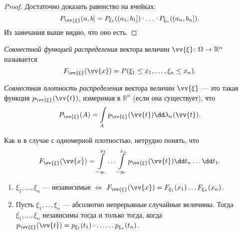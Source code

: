  \begin{proof}
     Достаточно доказать равенство на ячейках:
     $$P_{\vv{\xi}}(a, b] = P_{\xi_1}((a_1, b_1])\cdot\ldots\cdot P_{\xi_n}((a_n, b_n]).$$
     Из замечания выше видно, что оно есть.
 \end{proof}

 \begin{definition} \textit{Совместной функцией распределения} вектора величин $\vv{\xi} \colon \Omega \rightarrow \mathbb{R}^n$ называется
     $$F_{\vv{\xi}}(\vv{x}) = P(\xi_1 \le x_1, \ldots, \xi_n \le x_n).$$
 \end{definition}

 \begin{definition}\textit{Совместная плотность распределения} вектора величин $\vv{\xi}$ --- это такая функция $p_{\vv{\xi}}(\vv{t})$, измеримая в $\mathbb{R}^n$ (если она существует), что
     $$P_{\vv{\xi}}(A) =\int\limits_A p_{\vv{\xi}}(\vv{t})\dd\lambda_n(\vv{t}).$$
 \end{definition}

 Как и в случае с одномерной плотностью, нетрудно понять, что
     $$F_{\vv{\xi}}(\vv{x}) =
         \int\limits_{-\infty}^{x_1}\ldots\int\limits_{-\infty}^{x_n}p_{\vv{\xi}}(\vv{t})\dd t_n\ldots \dd t_1.$$

 \begin{corollary}
     \begin{enumerate}
         \item $\xi_1, \ldots, \xi_n$ --- независимые $\iff$ $F_{\vv{\xi}}(\vv{x}) = F_{\xi_1}(x_1)\ldots F_{\xi_n}(x_n)$.

          

         \item Пусть $\xi_1, \ldots, \xi_n$ --- абсолютно непрерывные случайные величины.
               Тогда $\xi_1, \ldots, \xi_n$ независимы тогда и только тогда, когда $p_{\vv{\xi}}(\vv{t}) = p_{\xi_1}(t_1)\cdot\ldots\ldots p_{\xi_n}(t_n)$.

      
     \end{enumerate}
 \end{corollary}
 
